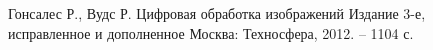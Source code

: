 \begin{thebibliography}{99}
    \setlength{\itemindent}{1.95cm} %
    \setlength{\leftmargin}{1.25cm} %
    \setlength{\labelsep}{2mm} %

    \raggedright%
    \justifying
    
     Гонсалес Р., Вудс Р.
    Цифровая обработка изображений Издание 3-е, исправленное и дополненное
    Москва: Техносфера, 2012. – 1104 с. 
    
    

    
    


\end{thebibliography}
